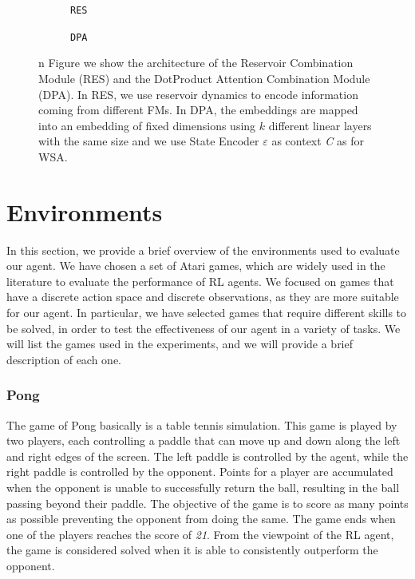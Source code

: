 \begin{figure}[ht]
    \centering
    \begin{subfigure}[b]{0.47\textwidth}
        \centering
        \fbox{\rule[-.5cm]{0cm}{4cm} \rule[-.5cm]{4cm}{0cm}}
        \caption{\texttt{RES}}
        \label{fig:reservoir_combination}
    \end{subfigure}
    \hfill
    \begin{subfigure}[b]{0.47\textwidth}
        \centering
        \fbox{\rule[-.5cm]{0cm}{4cm} \rule[-.5cm]{4cm}{0cm}}
        \caption{\texttt{DPA}}
        \label{fig:dpa}
    \end{subfigure}

    \caption{n Figure we show the architecture of the Reservoir Combination Module (RES) and the DotProduct Attention Combination Module (DPA). In RES, we use reservoir dynamics to encode information coming from different FMs. In DPA, the embeddings are mapped into an embedding of fixed dimensions using $k$ different linear layers with the same size and we use State Encoder $\varepsilon$ as context \textit{C} as for WSA.}
    \label{fig:dpa_combination}
\end{figure}

\section{Environments}
\label{sec:environments}
In this section, we provide a brief overview of the environments used to evaluate our agent.
We have chosen a set of Atari games, which are widely used in the literature to evaluate the performance of RL agents.
We focused on games that have a discrete action space and discrete observations, as they are more suitable for our agent.
In particular, we have selected games that require different skills to be solved, in order to test the effectiveness of our agent in a variety of tasks.
We will list the games used in the experiments, and we will provide a brief description of each one.

\subsubsection{Pong}
The game of Pong basically is a table tennis simulation.
This game is played by two players, each controlling a paddle that can move up and down along the left and right edges of the screen.
The left paddle is controlled by the agent, while the right paddle is controlled by the opponent.
Points for a player are accumulated when the opponent is unable to successfully return the ball, resulting in the ball passing beyond their paddle.
The objective of the game is to score as many points as possible preventing the opponent from doing the same.
The game ends when one of the players reaches the score of \textit{21}.
From the viewpoint of the RL agent, the game is considered solved when it is able to consistently outperform the opponent.


